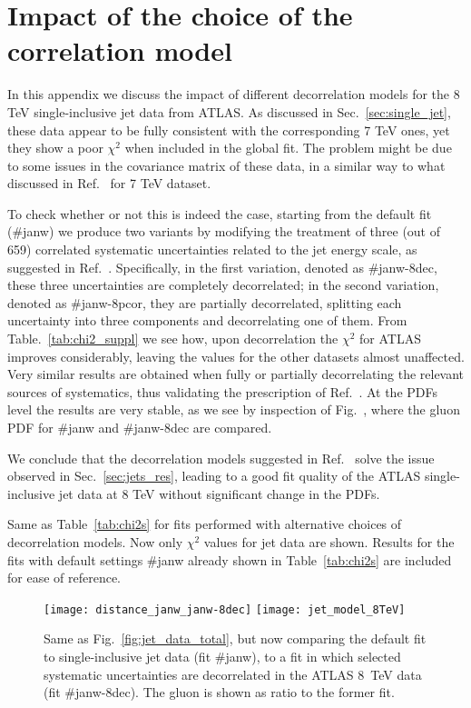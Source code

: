 
\chapter{Impact of the choice of the correlation model}
\label{app:jets}
In this appendix we discuss the impact of different decorrelation models for the 8 TeV single-inclusive jet data
from ATLAS.
As discussed in Sec.~\ref{sec:single_jet}, these data appear to be fully consistent with the corresponding
7 TeV ones, yet they show a poor $\chi^2$ when included in the global fit.
The problem might be due to some issues in the covariance matrix of these data, in a similar way 
to what discussed in Ref.~\cite{Harland-Lang:2017ytb} for 7 TeV dataset.

%
To check whether or not this is indeed the case, starting from the default fit (\#janw) we produce two variants 
by modifying the treatment of three (out of 659) correlated systematic uncertainties
related to the jet energy scale, as suggested in Ref.~\cite{Aaboud:2017dvo}.
Specifically, in the first variation, denoted as \#janw-8dec, these three uncertainties are completely decorrelated;
in the second variation, denoted as \#janw-8pcor, they are partially decorrelated, splitting each uncertainty 
into three components and decorrelating one of them.
From Table.~\ref{tab:chi2_suppl} we see how, upon decorrelation the $\chi^2$ for ATLAS improves considerably, leaving the 
values for the other datasets almost unaffected. Very similar results are obtained when fully or partially 
decorrelating the relevant sources of systematics, thus validating the prescription of Ref.~\cite{Aaboud:2017dvo}.
At the PDFs level the results are very stable, as we see by inspection of Fig.~, where the gluon PDF for 
\#janw and \#janw-8dec are compared.

%
We conclude that the decorrelation models suggested in Ref.~\cite{Aaboud:2017dvo} solve the issue observed in
Sec.~\ref{sec:jets_res}, leading to a good fit quality of the ATLAS single-inclusive jet data at 8 TeV without
significant change in the PDFs.

\begin{table}[!t]
    \renewcommand*{\arraystretch}{1.60}
    \scriptsize
    \centering
    
    \vspace{0.3cm}
    \caption{Same as Table~\ref{tab:chi2s} for
      fits performed with alternative choices of decorrelation models.
      Now only $\chi^2$ values for jet data are shown. Results for the fits with default settings
      \#janw already shown  in Table~\ref{tab:chi2s} are included for ease of reference.}
    \label{tab:chi2_suppl}
\end{table}

\begin{figure}[!t]
    \centering
    \texttt{[image: distance\_janw\_janw-8dec]}
    \texttt{[image: jet\_model\_8TeV]}\\
    \caption{Same as Fig.~\ref{fig:jet_data_total}, but now comparing
      the default fit to single-inclusive jet data (fit \#janw), to a fit in which selected systematic uncertainties
      are decorrelated in the ATLAS 8~TeV data (fit \#janw-8dec). The gluon is  shown as ratio to the former fit.}
    \label{fig:jet_data_model_8TeV} 
\end{figure}